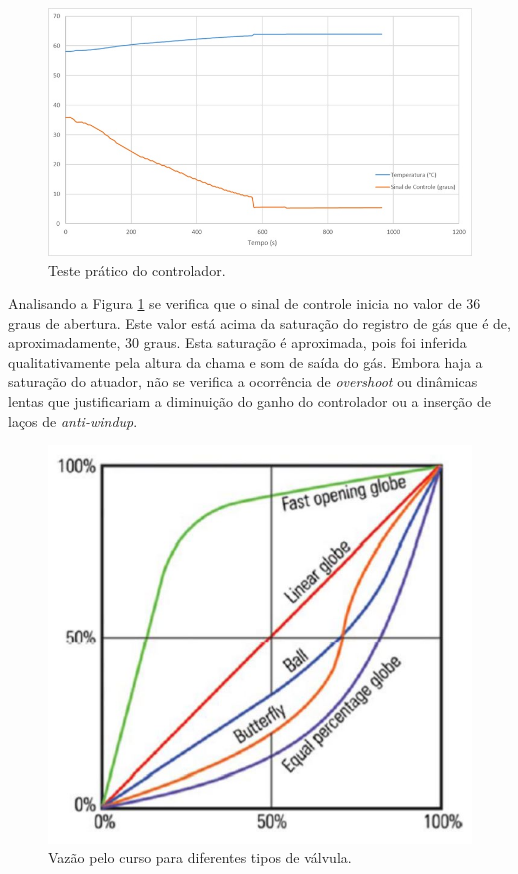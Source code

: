 \begin{figure}[htb]
	\caption{\label{testeControlador}Teste prático do controlador.}
	\begin{center}
	    \includegraphics[width=0.9\linewidth]{./img/testeControlador.jpg}
	\end{center}
\end{figure}

Analisando a Figura \ref{testeControlador} se verifica que o sinal de controle inicia no valor de 36 graus de abertura. Este valor está acima da saturação do registro de gás que é de, aproximadamente, 30 graus. Esta saturação é aproximada, pois foi inferida qualitativamente pela altura da chama e som de saída do gás. Embora haja a saturação do atuador, não se verifica a ocorrência de \textit{overshoot} ou dinâmicas lentas que justificariam a diminuição do ganho do controlador ou a inserção de laços de \textit{anti-windup}.



\begin{figure}[htb]
	\caption{\label{curvaValvula}Vazão pelo curso para diferentes tipos de válvula.}
	\begin{center}
	    \includegraphics[width=0.55\linewidth]{./img/curvaValvulas.jpg}
	\end{center}
\end{figure}

